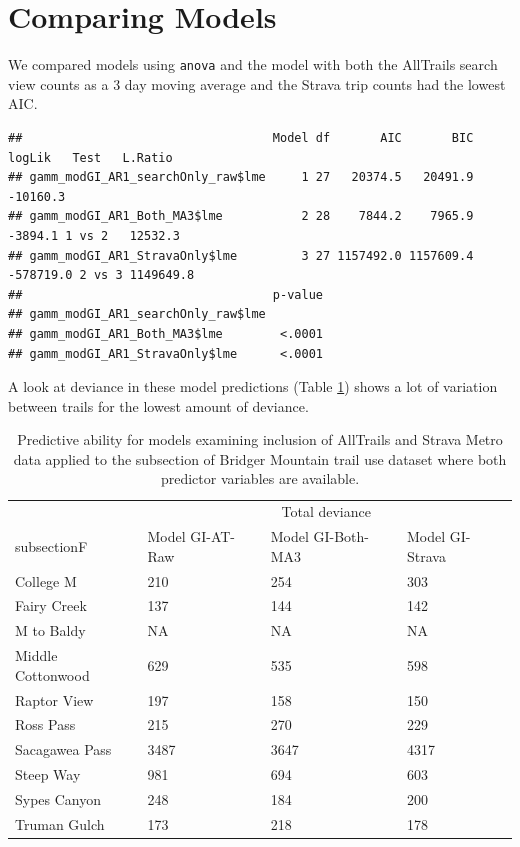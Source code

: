 \documentclass[
]{book}
\begin{document}
\hypertarget{comparing-models}{%
\section{Comparing Models}\label{comparing-models}}

We compared models using \texttt{anova} and the model with both the AllTrails search view counts as a 3 day moving average and the Strava trip counts had the lowest AIC.

\begin{verbatim}
##                                   Model df       AIC       BIC    logLik   Test   L.Ratio
## gamm_modGI_AR1_searchOnly_raw$lme     1 27   20374.5   20491.9  -10160.3                 
## gamm_modGI_AR1_Both_MA3$lme           2 28    7844.2    7965.9   -3894.1 1 vs 2   12532.3
## gamm_modGI_AR1_StravaOnly$lme         3 27 1157492.0 1157609.4 -578719.0 2 vs 3 1149649.8
##                                   p-value
## gamm_modGI_AR1_searchOnly_raw$lme        
## gamm_modGI_AR1_Both_MA3$lme        <.0001
## gamm_modGI_AR1_StravaOnly$lme      <.0001
\end{verbatim}

A look at deviance in these model predictions (Table \ref{tab:ATdeviance-kable}) shows a lot of variation between trails for the lowest amount of deviance.

\begin{table}

\caption{\label{tab:ATdeviance-kable}Predictive ability for models examining inclusion of AllTrails and Strava Metro data applied to the subsection of Bridger Mountain trail use dataset where both predictor variables are available.}
\centering
\begin{tabular}[t]{llll}
\toprule
\multicolumn{1}{c}{ } & \multicolumn{3}{c}{Total deviance} \\
\cmidrule(l{3pt}r{3pt}){2-4}
subsectionF & Model GI-AT-Raw & Model GI-Both-MA3 & Model GI-Strava\\
\midrule
College M & 210 & 254 & 303\\
Fairy Creek & 137 & 144 & 142\\
M to Baldy & NA & NA & NA\\
Middle Cottonwood & 629 & 535 & 598\\
Raptor View & 197 & 158 & 150\\
\addlinespace
Ross Pass & 215 & 270 & 229\\
Sacagawea Pass & 3487 & 3647 & 4317\\
Steep Way & 981 & 694 & 603\\
Sypes Canyon & 248 & 184 & 200\\
Truman Gulch & 173 & 218 & 178\\
\bottomrule
\end{tabular}
\end{table}
\end{document}
